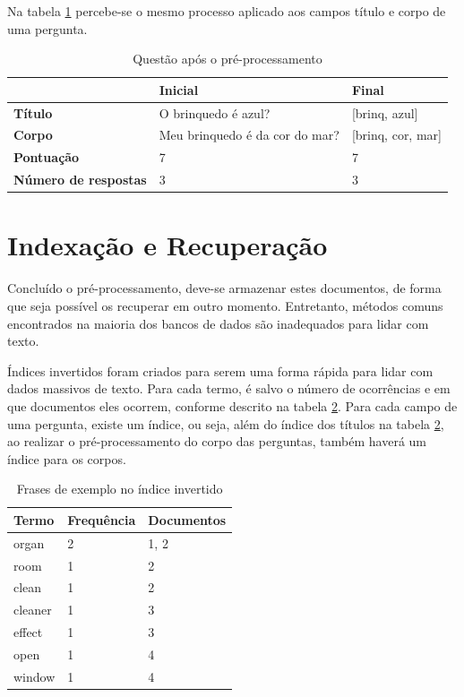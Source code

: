  Na tabela \ref{tab:quenstionpreprocessed} percebe-se o mesmo processo aplicado aos campos título e corpo de uma pergunta.

\begin{table}[htb]
	\centering
    \def\arraystretch{1.2} %
    \begin{tabular}{|l|l|l|}
        \hline
        & \textbf{Inicial} & \textbf{Final} \\ \hline
        \textbf{Título}              & O brinquedo é azul?            & [brinq, azul] \\ \hline
        \textbf{Corpo}               & Meu brinquedo é da cor do mar? & [brinq, cor, mar] \\ \hline
        \textbf{Pontuação}           & 7                              & 7 \\ \hline
        \textbf{Número de respostas} & 3                              & 3 \\ \hline
    \end{tabular}
	\caption{Questão após o pré-processamento}
    \label{tab:quenstionpreprocessed}
\end{table}     

\section{Indexação e Recuperação}
Concluído o pré-processamento, deve-se armazenar estes documentos, de forma que seja possível os recuperar em outro momento. Entretanto, métodos comuns encontrados na maioria dos bancos de dados são inadequados para lidar com texto.

Índices invertidos foram criados para serem uma forma rápida para lidar com dados massivos de texto. Para cada termo, é salvo o número de ocorrências e em que documentos eles ocorrem, conforme descrito na tabela \ref{tab:invertedindex}. Para cada campo de uma pergunta, existe um índice, ou seja, além do índice dos títulos na tabela \ref{tab:invertedindex}, ao realizar o pré-processamento do corpo das perguntas, também haverá um índice para os corpos.

\begin{table}[htb]
	\centering
    \def\arraystretch{1.2} 
    \begin{tabular}{|l|l|l|}
        \hline
        \textbf{Termo} & \textbf{Frequência} & \textbf{Documentos} \\ \hline
        organ & 2  & 1, 2            \\ \hline
        room & 1  & 2 \\ \hline
        clean & 1  & 2                              \\ \hline
        cleaner & 1  & 3                             \\ \hline
        effect & 1  & 3                             \\ \hline
        open & 1  & 4                             \\ \hline
        window & 1  & 4                             \\ \hline
    \end{tabular}
	\caption{Frases de exemplo no índice invertido}
    \label{tab:invertedindex}
\end{table}

